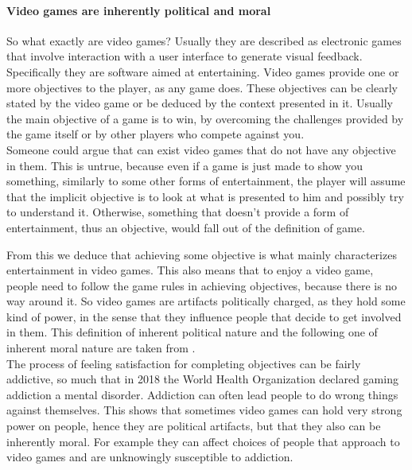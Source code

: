 \documentclass[10pt,a4paper]{article}
\begin{document}
\paragraph{Video games are inherently political and moral}
So what exactly are video games? Usually they are described as electronic games that involve interaction with a user interface to generate visual feedback. 
Specifically they are software aimed at entertaining.
Video games provide one or more objectives to the player, as any game does. 
These objectives can be clearly stated by the video game or be deduced by the context presented in it.
Usually the main objective of a game is to win, by overcoming the challenges provided by the game itself or by other players who compete against you. \\
Someone could argue that can exist video games that do not have any objective in them. 
This is untrue, because even if a game is just made to show you something, similarly to some other forms of entertainment, the player will assume that the implicit objective is to look at what is presented to him and possibly try to understand it. 
Otherwise, something that doesn't provide a form of entertainment, thus an objective, would fall out of the definition of game.

From this we deduce that achieving some objective is what mainly characterizes entertainment in video games.
This also means that to enjoy a video game, people need to follow the game rules in achieving objectives, because there is no way around it.
So video games are artifacts politically charged, as they hold some kind of power, in the sense that they influence people that decide to get involved in them. This definition of inherent political nature and the following one of inherent moral nature are taken from \parencite{politics}.\\
The process of feeling satisfaction for completing objectives can be fairly addictive, so much that in 2018 the World Health Organization declared gaming addiction a mental disorder.
Addiction can often lead people to do wrong things against themselves. 
This shows that sometimes video games can hold very strong power on people, hence they are political artifacts, but that they also can be inherently moral.
For example they can affect choices of people that approach to video games and are unknowingly susceptible to addiction. 
\end{document}
